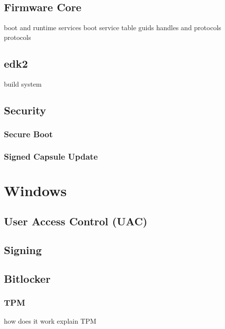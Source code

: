 \subsection{Firmware Core}
boot and runtime services
boot service table
guids
handles and protocols
protocols

\subsection{edk2}
build system

\subsection{Security}
\subsubsection{Secure Boot}
\subsubsection{Signed Capsule Update}

\section{Windows}
\subsection{User Access Control (UAC)}
\subsection{Signing}
\subsection{Bitlocker}
\subsubsection{TPM}
how does it work
explain TPM